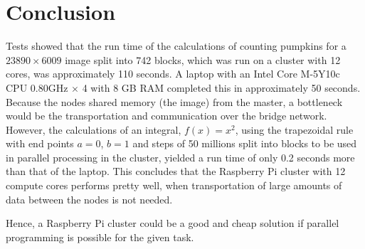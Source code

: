 \documentclass[../Head/Report.tex]{subfiles}
\begin{document}
\section{Conclusion}
Tests showed that the run time of the calculations of counting pumpkins for a $23890 \times 6009$ image split into 742 blocks, which was run on a cluster with 12 cores, was approximately 110 seconds. A laptop with an Intel Core M-5Y10c CPU 0.80GHz $\times $ 4 with 8 GB RAM completed this in approximately 50 seconds. Because the nodes shared memory (the image) from the master, a bottleneck would be the transportation and communication over the bridge network. However, the calculations of an integral, $f(x) = x^2$, using the trapezoidal rule with end points $a=0$, $b=1$ and steps of 50 millions split into blocks to be used in parallel processing in the cluster, yielded a run time of only 0.2 seconds more than that of the laptop. This concludes that the  Raspberry Pi cluster with 12 compute cores performs pretty well, when transportation of large amounts of data between the nodes is not needed. 

Hence, a Raspberry Pi cluster could be a good and cheap solution if parallel programming is possible for the given task.  
\end{document}
